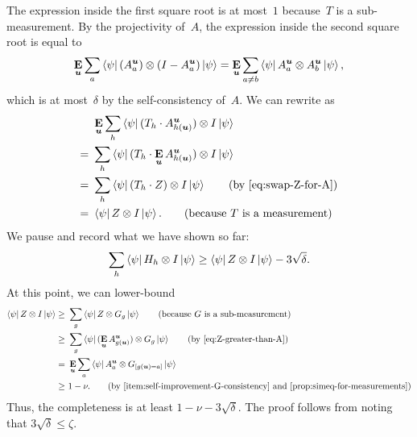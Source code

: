The expression inside the first square root is at most~$1$ because~$T$ is a sub-measurement.
By the projectivity of~$A$, the expression inside the second square root is equal to
\begin{equation*}
\mathop{\bf E\/}_{\boldsymbol{u}} \sum_a \bra{\psi} ( A^{\boldsymbol{u}}_{a}) \otimes (I-A^{\boldsymbol{u}}_{a}) \ket{\psi}
= \mathop{\bf E\/}_{\boldsymbol{u}} \sum_{a\neq b} \bra{\psi} A^{\boldsymbol{u}}_{a} \otimes A^{\boldsymbol{u}}_{b} \ket{\psi},
\end{equation*}
which is at most~$\delta$ by the self-consistency of~$A$.
We can rewrite  as
\begin{align*}
&\E_{\bu} \sum_h \bra{\psi} ( T_{h} \cdot A^{\bu}_{h(\bu)}) \otimes I \ket{\psi}\\
 =~&  \sum_h \bra{\psi} ( T_{h} \cdot\E_{\bu} A^{\bu}_{h(\bu)}) \otimes I \ket{\psi}\\
 =~&  \sum_h \bra{\psi} ( T_{h} \cdot Z) \otimes I \ket{\psi}\tag{by \Cref{eq:swap-Z-for-A}}\\
=~&  \bra{\psi}  Z \otimes I \ket{\psi}.\tag{because~$T$ is a measurement}
\end{align*}
We pause and record what we have shown so far:
\begin{equation}\label{eq:gonna-use-this-later-H-versus-Z}
\sum_h \bra{\psi} H_h \otimes I \ket{\psi} \geq \bra{\psi}  Z \otimes I \ket{\psi} - 3\sqrt{\delta}.
\end{equation}
At this point, we can lower-bound 
\begin{align*}
\bra{\psi}  Z \otimes I \ket{\psi}
\geq~& \sum_g \bra{\psi} Z \otimes G_g \ket{\psi} \tag{because~$G$ is a sub-measurement}\\
\geq~& \sum_g \bra{\psi} (\E_{\bu} A^{\bu}_{g(\bu)}) \otimes G_g \ket{\psi} \tag{by \Cref{eq:Z-greater-than-A}}\\
=~& \E_{\bu} \sum_a \bra{\psi}  A^{\bu}_{a} \otimes G_{[g(\bu)=a]} \ket{\psi}\\
\geq~& 1-\nu.\tag{by \Cref{item:self-improvement-G-consistency} and \Cref{prop:simeq-for-measurements}}
\end{align*}
Thus, the completeness is at least $1  - \nu - 3\sqrt{\delta}$. 
The proof follows from noting that $3\sqrt{\delta} \leq \zeta$.

